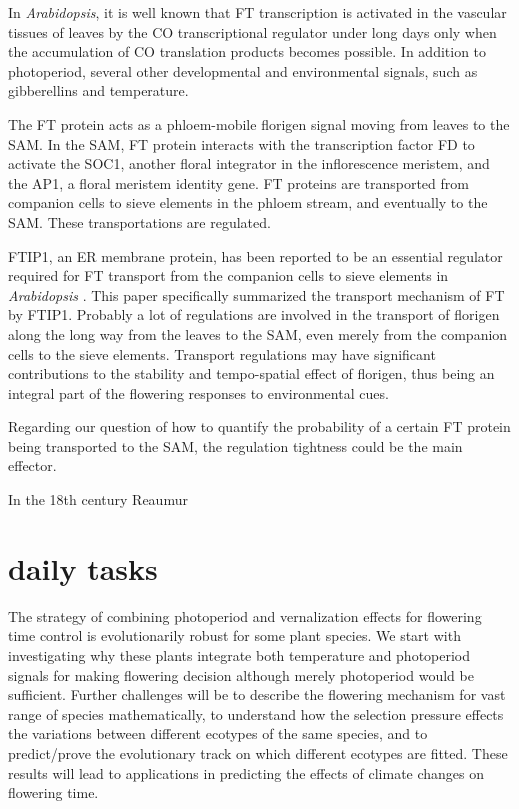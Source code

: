 \documentclass[paper=a4, fontsize=12pt]{scrartcl}	%
\numberwithin{equation}{section}					%
\numberwithin{figure}{section}					%
\numberwithin{table}{section}					%
\begin{document}
In {\it Arabidopsis}, it is well known that FT transcription is activated in the vascular tissues of leaves by the CO transcriptional regulator under long days only when the accumulation of CO translation products becomes possible. In addition to photoperiod, several other developmental and environmental signals, such as gibberellins and temperature. 

The FT protein acts as a phloem-mobile florigen signal moving from leaves to the SAM. In the SAM, FT protein interacts with the transcription factor FD to activate the SOC1, another floral integrator in the inflorescence meristem, and the AP1, a floral meristem identity gene. FT proteins are transported from companion cells to sieve elements in the phloem stream, and eventually to the SAM. These transportations are regulated. 

FTIP1, an ER membrane protein, has been reported to be an essential regulator required for FT transport from the companion cells to sieve elements in {\it Arabidopsis }.  This paper specifically summarized the transport mechanism of FT by FTIP1. Probably a lot of regulations are involved in the transport of florigen along the long way from the leaves to the SAM, even merely from the companion cells to the sieve elements. Transport regulations may have significant contributions to the stability and tempo-spatial effect of florigen, thus being an integral part of the flowering responses to environmental cues.

Regarding our question of how to quantify the probability of a certain FT protein being transported to the SAM, the regulation tightness could be the main effector. 


\cite{chew2012} In the 18th century Reaumur 


\cite{satake2013}



\section{daily tasks}

The strategy of combining photoperiod and vernalization effects for flowering time control is evolutionarily robust for some plant species. We start with investigating why these plants integrate both temperature and photoperiod signals for making flowering decision although merely photoperiod would be sufficient. Further challenges will be to describe the flowering mechanism for vast range of species mathematically, to understand how the selection pressure effects the variations between different ecotypes of the same species, and to predict/prove the evolutionary track on which different ecotypes are fitted. These results will lead to applications in predicting the effects of climate changes on flowering time. 
\end{document}
